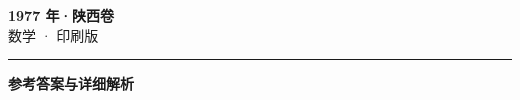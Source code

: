 \documentclass[zihao=5, a4paper]{ctexart}
\begin{document}
\begin{center}
  {\Large\bfseries 1977 年·陕西卷}\\[4pt]
  {\large 数学 · 印刷版}
\end{center}
\medskip
{}

\par\bigskip\hrule\bigskip
{}
\begin{center}{\large\bfseries 参考答案与详细解析}\end{center}
\smallskip

\end{document}
